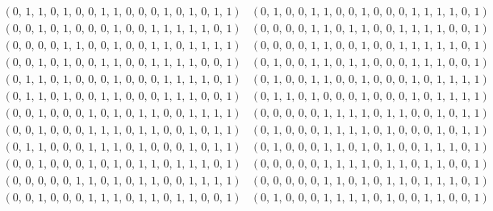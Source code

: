 \documentclass[11pt,a4paper,abstract=yes]{scrartcl}
\theoremstyle{plain}
\begin{document}
\begin{mexample}
\begin{tiny}
\begin{displaymath}
\begin{array}{cc}
 \\
\left(0,\,1,\,1,\,0,\,1,\,0,\,0,\,1,\,1,\,0,\,0,\,0,\,1,\,0,\,1,\,0,\,1,\,1\right)
 &
\left(0,\,1,\,0,\,0,\,1,\,1,\,0,\,0,\,1,\,0,\,0,\,0,\,1,\,1,\,1,\,1,\,0,\,1\right)
 \\
\left(0,\,0,\,1,\,0,\,1,\,0,\,0,\,0,\,1,\,0,\,0,\,1,\,1,\,1,\,1,\,1,\,0,\,1\right)
 &
\left(0,\,0,\,0,\,0,\,1,\,1,\,0,\,1,\,1,\,0,\,0,\,1,\,1,\,1,\,1,\,0,\,0,\,1\right)
 \\
\left(0,\,0,\,0,\,0,\,1,\,1,\,0,\,0,\,1,\,0,\,0,\,1,\,1,\,0,\,1,\,1,\,1,\,1\right)
 &
\left(0,\,0,\,0,\,0,\,1,\,1,\,0,\,0,\,1,\,0,\,0,\,1,\,1,\,1,\,1,\,1,\,0,\,1\right)
 \\
\left(0,\,0,\,1,\,0,\,1,\,0,\,0,\,1,\,1,\,0,\,0,\,1,\,1,\,1,\,1,\,0,\,0,\,1\right)
 &
\left(0,\,1,\,0,\,0,\,1,\,1,\,0,\,1,\,1,\,0,\,0,\,0,\,1,\,1,\,1,\,0,\,0,\,1\right)
 \\
\left(0,\,1,\,1,\,0,\,1,\,0,\,0,\,0,\,1,\,0,\,0,\,0,\,1,\,1,\,1,\,1,\,0,\,1\right)
 &
\left(0,\,1,\,0,\,0,\,1,\,1,\,0,\,0,\,1,\,0,\,0,\,0,\,1,\,0,\,1,\,1,\,1,\,1\right)
 \\
\left(0,\,1,\,1,\,0,\,1,\,0,\,0,\,1,\,1,\,0,\,0,\,0,\,1,\,1,\,1,\,0,\,0,\,1\right)
 &
\left(0,\,1,\,1,\,0,\,1,\,0,\,0,\,0,\,1,\,0,\,0,\,0,\,1,\,0,\,1,\,1,\,1,\,1\right)
 \\
\left(0,\,0,\,1,\,0,\,0,\,0,\,1,\,0,\,1,\,0,\,1,\,1,\,0,\,0,\,1,\,1,\,1,\,1\right)
 &
\left(0,\,0,\,0,\,0,\,0,\,1,\,1,\,1,\,1,\,0,\,1,\,1,\,0,\,0,\,1,\,0,\,1,\,1\right)
 \\
\left(0,\,0,\,1,\,0,\,0,\,0,\,1,\,1,\,1,\,0,\,1,\,1,\,0,\,0,\,1,\,0,\,1,\,1\right)
 &
\left(0,\,1,\,0,\,0,\,0,\,1,\,1,\,1,\,1,\,0,\,1,\,0,\,0,\,0,\,1,\,0,\,1,\,1\right)
 \\
\left(0,\,1,\,1,\,0,\,0,\,0,\,1,\,1,\,1,\,0,\,1,\,0,\,0,\,0,\,1,\,0,\,1,\,1\right)
 &
\left(0,\,1,\,0,\,0,\,0,\,1,\,1,\,0,\,1,\,0,\,1,\,0,\,0,\,1,\,1,\,1,\,0,\,1\right)
 \\
\left(0,\,0,\,1,\,0,\,0,\,0,\,1,\,0,\,1,\,0,\,1,\,1,\,0,\,1,\,1,\,1,\,0,\,1\right)
 &
\left(0,\,0,\,0,\,0,\,0,\,1,\,1,\,1,\,1,\,0,\,1,\,1,\,0,\,1,\,1,\,0,\,0,\,1\right)
 \\
\left(0,\,0,\,0,\,0,\,0,\,1,\,1,\,0,\,1,\,0,\,1,\,1,\,0,\,0,\,1,\,1,\,1,\,1\right)
 &
\left(0,\,0,\,0,\,0,\,0,\,1,\,1,\,0,\,1,\,0,\,1,\,1,\,0,\,1,\,1,\,1,\,0,\,1\right)
 \\
\left(0,\,0,\,1,\,0,\,0,\,0,\,1,\,1,\,1,\,0,\,1,\,1,\,0,\,1,\,1,\,0,\,0,\,1\right)
 &
\left(0,\,1,\,0,\,0,\,0,\,1,\,1,\,1,\,1,\,0,\,1,\,0,\,0,\,1,\,1,\,0,\,0,\,1\right)
 \\

\end{array}
\end{displaymath}
\end{tiny}
\end{mexample}
\end{document}
